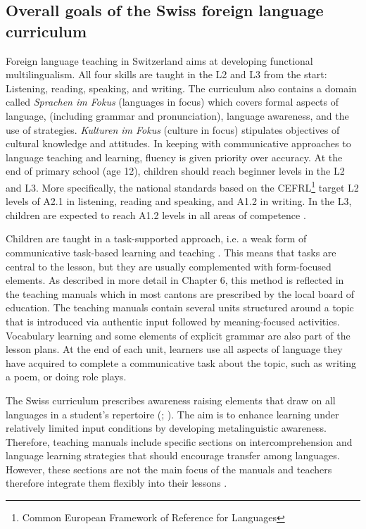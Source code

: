 \documentclass[output=paper]{langsci/langscibook}
\begin{document}
\subsection{Overall goals of the Swiss foreign language curriculum}
Foreign language teaching in Switzerland aims at developing functional multilingualism. All four skills are taught in the L2 and L3 from the start: Listening, reading, speaking, and writing. The curriculum also contains a domain called \textit{Sprachen im Fokus} (languages in focus) which covers formal aspects of language, (including grammar and pronunciation), language awareness, and the use of strategies. \textit{Kulturen im Fokus} (culture in focus) stipulates objectives of cultural knowledge and attitudes. In keeping with communicative approaches to language teaching and learning, fluency is given priority over accuracy. At the end of primary school (age 12), children should reach beginner levels in the L2 and L3. More specifically, the national standards based on the CEFRL\footnote{Common European Framework of Reference for Languages} target L2 levels of A2.1 in listening, reading and speaking, and A1.2 in writing. In the L3, children are expected to reach A1.2 levels in all areas of competence \citep[17]{Zuerich2017}. 

Children are taught in a task-supported approach, i.e. a weak form of communicative task-based learning and teaching \citep{Ellis2017}. This means that tasks are central to the lesson, but they are usually complemented with form-focused elements. As described in more detail in Chapter 6, this method is reflected in the teaching manuals which in most cantons are prescribed by the local board of education. The teaching manuals contain several units structured around a topic that is introduced via authentic input followed by meaning-focused activities. Vocabulary learning and some elements of explicit grammar are also part of the lesson plans. At the end of each unit, learners use all aspects of language they have acquired to complete a communicative task about the topic, such as writing a poem, or doing role plays. 

The Swiss curriculum prescribes awareness raising elements that draw on all languages in a student’s repertoire (\citealt{EDK2004}; \citealt{Passepartout2008}). The aim is to enhance learning under relatively limited input conditions by developing metalinguistic awareness. Therefore, teaching manuals include specific sections on intercomprehension and language learning strategies that should encourage transfer among languages. However, these sections are not the main focus of the manuals and teachers therefore integrate them flexibly into their lessons \citep[8]{Zuerich2017}. 
\end{document}
